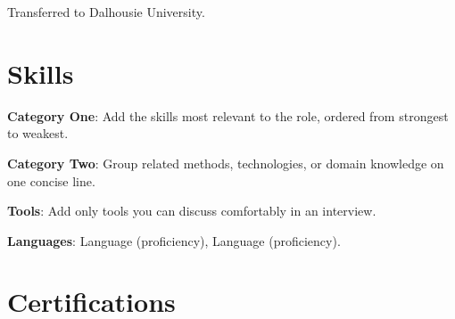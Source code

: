 \documentclass{resume}
\begin{document}
\begin{jobduties}
  \item Transferred to Dalhousie University.
\end{jobduties}

\section{Skills}
\begin{skillitems}
  \item \textbf{Category One}: Add the skills most relevant to the role, ordered from strongest to weakest.
  \item \textbf{Category Two}: Group related methods, technologies, or domain knowledge on one concise line.
  \item \textbf{Tools}: Add only tools you can discuss comfortably in an interview.
  \item \textbf{Languages}: Language (proficiency), Language (proficiency).
\end{skillitems}

\section{Certifications}

\end{document}
